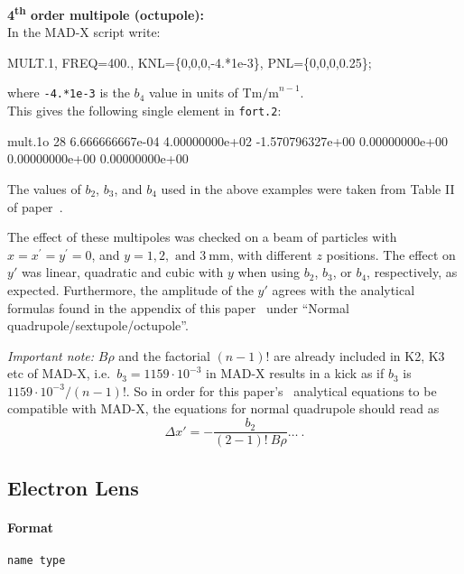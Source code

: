 \noindent\textbf{4\textsuperscript{th} order multipole (octupole):}\\
\noindent In  the MAD-X script write:
\begin{ctverbatim}
MULT.1, FREQ=400., KNL=\{0,0,0,-4.*1e-3\}, PNL=\{0,0,0,0.25\};
\end{ctverbatim}
where \texttt{-4.*1e-3} is the $b_4$ value in units of $\mathrm{Tm/m}^{n-1}$.\\
This gives the following single element in \texttt{fort.2}:
\begin{ctverbatim}
mult.1o  28  6.666666667e-04  4.00000000e+02  -1.570796327e+00  0.00000000e+00  0.00000000e+00  0.00000000e+00
\end{ctverbatim}

\bigskip
\noindent The values of $b_2$, $b_3$, and $b_4$ used in the above examples were taken from Table II of paper~\cite{RFmultsPaper}.

The effect of these multipoles was checked on a beam of particles with $x=x^{\prime}=y^{\prime}=0$, and $y= 1, 2, \text{ and } 3~\mathrm{mm}$, with different $z$ positions.
The effect on $y'$ was linear, quadratic and cubic with $y$ when using $b_2$, $b_3$, or $b_4$, respectively, as expected.
Furthermore, the amplitude of the $y'$ agrees with the analytical formulas found in the appendix of this paper~\cite{RFmultsPaper} under ``Normal quadrupole/sextupole/octupole''.

\textit{Important note:} $B\rho$ and the factorial $(n-1)!$ are already included in K2, K3 etc of MAD-X, i.e.\ $b_3=1159\cdot10^{-3}$ in MAD-X results in a kick as if $b_3$ is $1159\cdot10^{-3}/(n-1)!$.
So in order for this paper's~\cite{RFmultsPaper} analytical equations to be compatible with MAD-X, the equations for normal quadrupole should read as
\begin{equation*}
    \Delta x'=-\frac{b_2}{(2-1)! ~ B\rho} \ldots~.
\end{equation*}

\subsection{Electron Lens} \label{ELEN}

\paragraph{Format} \texttt{name type}

